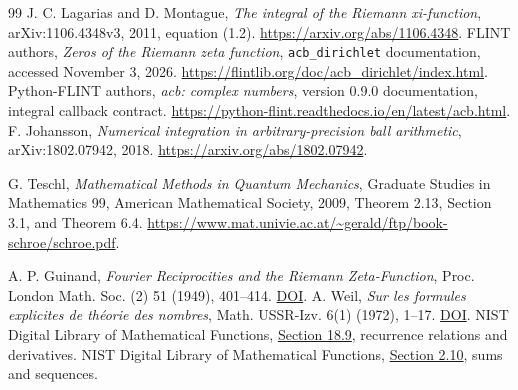 \documentclass[11pt,a4paper]{article}
\numberwithin{equation}{section}
\theoremstyle{definition}\newtheorem{definition}[theorem]{Definition}
\theoremstyle{remark}\newtheorem{remark}[theorem]{Remark}
\begin{document}
\begin{thebibliography}{99}
 J. C. Lagarias and D. Montague,
\emph{The integral of the Riemann xi-function}, arXiv:1106.4348v3, 2011,
equation (1.2). \url{https://arxiv.org/abs/1106.4348}.
 FLINT authors, \emph{Zeros of the Riemann zeta function},
\texttt{acb\_dirichlet} documentation, accessed November 3, 2026.
\url{https://flintlib.org/doc/acb_dirichlet/index.html}.
 Python-FLINT authors, \emph{acb: complex numbers},
version 0.9.0 documentation, integral callback contract.
\url{https://python-flint.readthedocs.io/en/latest/acb.html}.
 F. Johansson, \emph{Numerical integration in
arbitrary-precision ball arithmetic}, arXiv:1802.07942, 2018.
\url{https://arxiv.org/abs/1802.07942}.

G. Teschl, \emph{Mathematical Methods in Quantum Mechanics},
Graduate Studies in Mathematics 99, American Mathematical Society, 2009,
Theorem 2.13, Section 3.1, and Theorem 6.4.
\url{https://www.mat.univie.ac.at/~gerald/ftp/book-schroe/schroe.pdf}.


 A. P. Guinand, \emph{Fourier Reciprocities and the Riemann Zeta-Function}, Proc. London Math. Soc. (2) 51 (1949), 401--414. \href{https://doi.org/10.1112/plms/s2-51.6.401}{DOI}.
 A. Weil, \emph{Sur les formules explicites de th\'eorie des nombres}, Math. USSR-Izv. 6(1) (1972), 1--17. \href{https://doi.org/10.1070/IM1972v006n01ABEH001866}{DOI}.
 NIST Digital Library of Mathematical Functions, \href{https://dlmf.nist.gov/18.9}{Section 18.9}, recurrence relations and derivatives.
 NIST Digital Library of Mathematical Functions, \href{https://dlmf.nist.gov/2.10}{Section 2.10}, sums and sequences.

\end{thebibliography}
\end{document}
